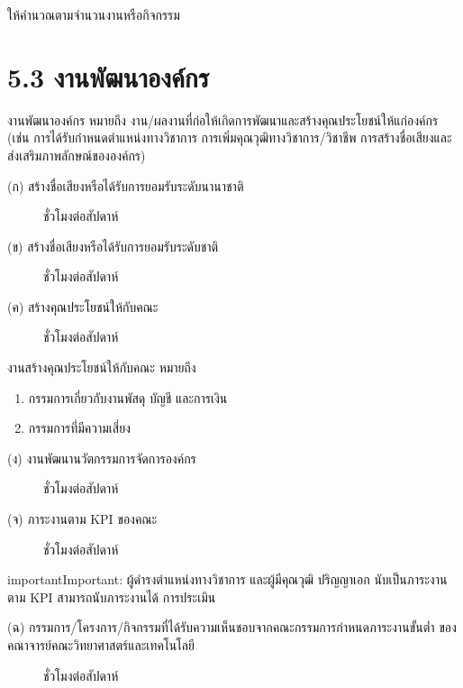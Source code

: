 \documentclass[a4paper,12pt,english]{sphinxmanual}
\begin{document}
ให้คำนวณตามจำนวนงานหรือกิจกรรม


\section{5.3 งานพัฒนาองค์กร}
\label{\detokenize{5etc:id9}}
งานพัฒนาองค์กร หมายถึง งาน/ผลงานที่ก่อให้เกิดการพัฒนาและสร้างคุณประโยชน์ให้แก่องค์กร (เช่น การได้รับกำหนดตำแหน่งทางวิชาการ การเพิ่มคุณวุฒิทางวิชาการ/วิชาชีพ การสร้างชื่อเสียงและส่งเสริมภาพลักษณ์ขององค์กร)
\begin{description}
\item[{(ก) สร้างชื่อเสียงหรือได้รับการยอมรับระดับนานาชาติ}]  ชั่วโมงต่อสัปดาห์

\item[{(ข) สร้างชื่อเสียงหรือได้รับการยอมรับระดับชาติ}]  ชั่วโมงต่อสัปดาห์

\item[{(ค) สร้างคุณประโยชน์ให้กับคณะ}]  ชั่วโมงต่อสัปดาห์

\end{description}

งานสร้างคุณประโยชน์ให้กับคณะ หมายถึง
\begin{enumerate}
%
\item {} 
กรรมการเกี่ยวกับงานพัสดุ บัญชี และการเงิน

\item {} 
กรรมการที่มีความเสี่ยง

\end{enumerate}
\begin{description}
\item[{(ง) งานพัฒนานวัตกรรมการจัดการองค์กร}]  ชั่วโมงต่อสัปดาห์

\item[{(จ) ภาระงานตาม KPI ของคณะ}]  ชั่วโมงต่อสัปดาห์

\end{description}

\begin{sphinxadmonition}{important}{Important:}
ผู้ดำรงตำแหน่งทางวิชาการ และผู้มีคุณวุฒิ ปริญญาเอก นับเป็นภาระงานตาม KPI สามารถนับภาระงานได้  การประเมิน
\end{sphinxadmonition}
\begin{description}
\item[{(ฉ) กรรมการ/โครงการ/กิจกรรมที่ได้รับความเห็นชอบจากคณะกรรมการกำหนดภาระงานขั้นต่ำ ของคณาจารย์คณะวิทยาศาสตร์และเทคโนโลยี}]  ชั่วโมงต่อสัปดาห์

\end{description}
\end{document}
